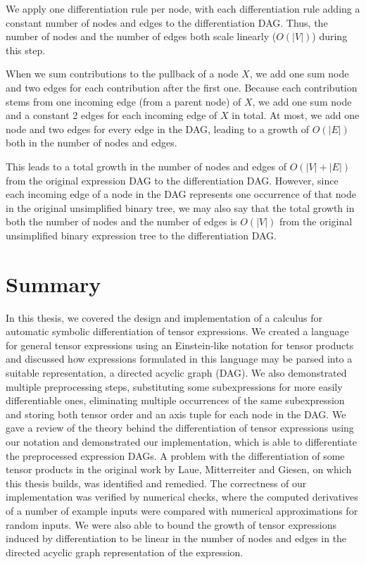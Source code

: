 \documentclass[12pt, a4paper]{report} %
\begin{document}
We apply one differentiation rule per node, with each differentiation rule adding a constant number of nodes and edges to the differentiation DAG.
Thus, the number of nodes and the number of edges both scale linearly ($O(|V|)$) during this step.

When we sum contributions to the pullback of a node $X$, we add one sum node and two edges for each contribution after the first one.
Because each contribution stems from one incoming edge (from a parent node) of $X$, we add one sum node and a constant 2 edges for each incoming edge of $X$ in total.
At most, we add one node and two edges for every edge in the DAG, leading to a growth of $O(|E|)$ both in the number of nodes and edges.

This leads to a total growth in the number of nodes and edges of $O(|V| + |E|)$ from the original expression DAG to the differentiation DAG.
However, since each incoming edge of a node in the DAG represents one occurrence of that node in the original unsimplified binary tree, we may also say that the total growth in both the number of nodes and the number of edges is $O(|V|)$ from the original unsimplified binary expression tree to the differentiation DAG.

\chapter{Summary}
In this thesis, we covered the design and implementation of a calculus for automatic symbolic differentiation of tensor expressions.
We created a language for general tensor expressions using an Einstein-like notation for tensor products and discussed how expressions formulated in this language may be parsed into a suitable representation, a directed acyclic graph (DAG).
We also demonstrated multiple preprocessing steps, substituting some subexpressions for more easily differentiable ones, eliminating multiple occurrences of the same subexpression and storing both tensor order and an axis tuple for each node in the DAG.
We gave a review of the theory behind the differentiation of tensor expressions using our notation and demonstrated our implementation, which is able to differentiate the preprocessed expression DAGs.
A problem with the differentiation of some tensor products in the original work \cite{tensorpaper} by Laue, Mitterreiter and Giesen, on which this thesis builds, was identified and remedied.
The correctness of our implementation was verified by numerical checks, where the computed derivatives of a number of example inputs were compared with numerical approximations for random inputs.
We were also able to bound the growth of tensor expressions induced by differentiation to be linear in the number of nodes and edges in the directed acyclic graph representation of the expression.
\end{document}

